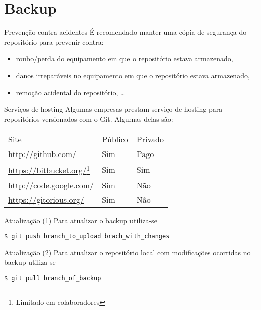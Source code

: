 \documentclass[11pt]{beamer}
\begin{document}
\section{Backup}
\begin{frame}{Prevenção contra acidentes}
    É recomendado manter uma cópia de segurança do repositório para prevenir
    contra:
    \begin{itemize}
        \item roubo/perda do equipamento em que o repositório estava armazenado,
        \item danos irreparáveis no equipamento em que o repositório estava armazenado,
        \item remoção acidental do repositório, \ldots
    \end{itemize}
\end{frame}

\begin{frame}{Serviços de hosting}
    Algumas empresas prestam serviço de hosting para repositórios versionados
    com o Git. Algumas delas são:
    \begin{center}
        \begin{tabular}{p{}p{}p{}}
            Site & Público & Privado \\
            \url{http://github.com/} & Sim & Pago \\
            \url{https://bitbucket.org/}\footnote{Limitado em colaboradores} & Sim & Sim \\
            \url{http://code.google.com/} & Sim & Não \\
            \url{https://gitorious.org/} & Sim & Não
        \end{tabular}
    \end{center}
\end{frame}

\begin{frame}[fragile]{Atualização (1)}
    Para atualizar o backup utiliza-se
    \begin{lstlisting}
$ git push branch_to_upload brach_with_changes
    \end{lstlisting}
\end{frame}

\begin{frame}[fragile]{Atualização (2)}
    Para atualizar o repositório local com modificações ocorridas no backup
    utiliza-se
    \begin{lstlisting}
$ git pull branch_of_backup
    \end{lstlisting}
\end{frame}
\end{document}
